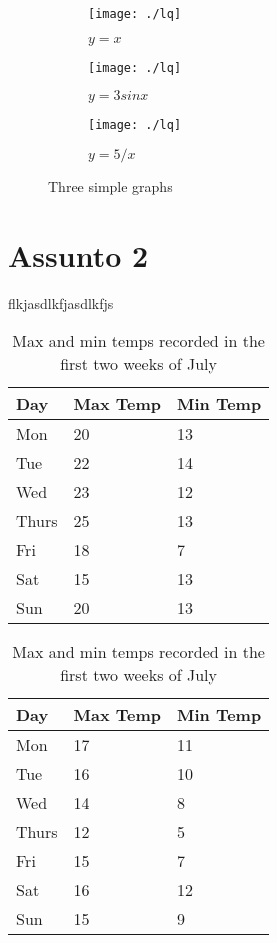 \begin{figure}
    \centering
    \begin{subfigure}[b]{0.3\textwidth}
        \centering
        \texttt{[image: ./lq]}
        \caption{$y=x$}
        \label{fig:y equals x}
    \end{subfigure}
    \hfill
    \begin{subfigure}[b]{0.3\textwidth}
        \centering
        \texttt{[image: ./lq]}
        \caption{$y=3sinx$}
        \label{fig:three sin x}
    \end{subfigure}
    \hfill
    \begin{subfigure}[b]{0.3\textwidth}
        \centering
        \texttt{[image: ./lq]}
        \caption{$y=5/x$}
        \label{fig:five over x}
    \end{subfigure}
       \caption{Three simple graphs}
       \label{fig:three graphs}
\end{figure}


\section{Assunto 2}
\label{sec:ass2}
flkjasdlkfjasdlkfjs

\begin{table}[h]
    \begin{subtable}[h]{0.45\textwidth}
        \centering
        \begin{tabular}{l | l | l}
        Day & Max Temp & Min Temp \\
        \hline \hline
        Mon & 20 & 13\\
        Tue & 22 & 14\\
        Wed & 23 & 12\\
        Thurs & 25 & 13\\
        Fri & 18 & 7\\
        Sat & 15 & 13\\
        Sun & 20 & 13
       \end{tabular}
       \caption{First Week}
       \label{tab:week1}
    \end{subtable}
    \hfill
    \begin{subtable}[h]{0.45\textwidth}
        \centering
        \begin{tabular}{l | l | l}
        Day & Max Temp & Min Temp \\
        \hline \hline
        Mon & 17 & 11\\
        Tue & 16 & 10\\
        Wed & 14 & 8\\
        Thurs & 12 & 5\\
        Fri & 15 & 7\\
        Sat & 16 & 12\\
        Sun & 15 & 9
        \end{tabular}
        \caption{Second Week}
        \label{tab:week2}
     \end{subtable}
     \caption{Max and min temps recorded in the first two weeks of July}
     \label{tab:temps}
\end{table}